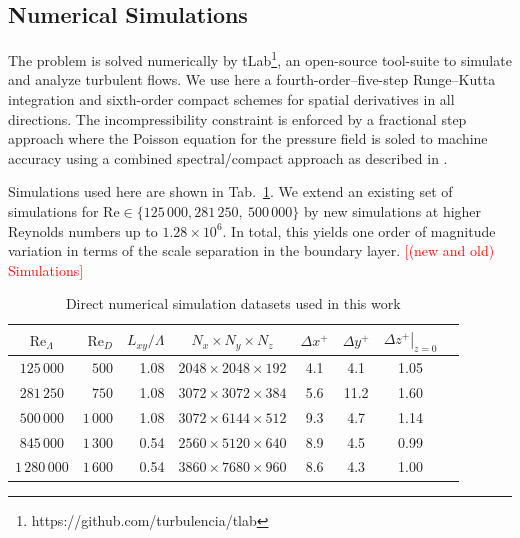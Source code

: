 \documentclass[a4paper,11pt]{amsart}
\newcommand{\todo}[1]{\textcolor{red}{$[$#1$]$}}
\newcommand{\RE}{\mathrm{Re}}
\begin{document}
\subsection{Numerical Simulations}
The problem is solved numerically by tLab\footnote{https://github.com/turbulencia/tlab},
an open-source tool-suite to simulate and analyze turbulent flows.
% 
We use here a fourth-order--five-step Runge--Kutta integration and sixth-order compact schemes
for spatial derivatives in all directions.
%
The incompressibility constraint is enforced by a fractional step approach where the Poisson equation
for the pressure field is soled to machine accuracy using a combined spectral/compact approach as
described in \citet{mellado:ZaM2012}.
%
\par
%
Simulations used here are shown in Tab.~\ref{tab:sim-setup}.
%
We extend an existing set of simulations for $\RE\in\{125\,000, 281\,250,\ 500\,000\}$ \citep[gray shading; cf.][]{ansorge:BM2014,ansorge:JFM2016} 
by new simulations at higher Reynolds numbers up to $1.28\times10^6$.
%
In total, this yields one order of magnitude variation in terms of the scale separation in the boundary layer.
%
\todo{(new and old) Simulations}
\begin{table}
  \caption{\label{tab:sim-setup} Direct numerical simulation datasets used in this work}
  \begin{tabular}{c r r c c c c c}
    \toprule 
    $\RE_\Lambda$ & $\RE_D$ & $L_{xy}/\Lambda$ & $N_x\times N_y\times N_z$ & $\Delta x^+$ & $\Delta y^+$ & $\left.\Delta z^+\right|_{z=0}$ \\ 
    \midrule
    \rowcolor{gray!30}
       $125\,000$ &    $500$& 1.08 & $2048\times2048\times192$&4.1& 4.1& 1.05\\
    \rowcolor{gray!30}
       $281\,250$ & $   750$& 1.08 & $3072\times3072\times384$&5.6&11.2& 1.60\\
    \rowcolor{gray!30}
       $500\,000$ & $1\,000$& 1.08 & $3072\times6144\times512$&9.3& 4.7& 1.14\\
    \midrule
       $845\,000$ & $1\,300$& 0.54 & $2560\times5120\times640$&8.9& 4.5& 0.99\\

    $1\,280\,000$ & $1\,600$& 0.54 & $3860\times7680\times960$&8.6& 4.3& 1.00\\ 
    \bottomrule 
  \end{tabular} 
\end{table}
%
\end{document}
